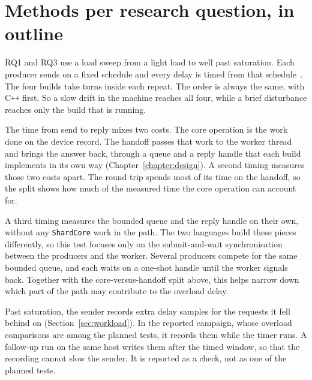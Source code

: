 \documentclass[english,oneside,a4paper,censored,csm,software-track-2020]{HYthesisML}
\begin{document}
\section[Methods per research question]{Methods per research question, in outline}\label{sec:methodbrief}
RQ1 and RQ3 use a load sweep from a light load to well past saturation. Each
producer sends on a fixed schedule and every delay is timed from that
schedule~\cite{schroeder2006openclosed}. The four builds take turns inside each
repeat. The order is always the same, with C\texttt{++} first. So a slow drift in
the machine reaches all four, while a brief disturbance reaches only the build
that is running.

The time from send to reply mixes two costs. The core operation is the work
done on the device record. The handoff passes that work to the worker thread
and brings the answer back, through a queue and a reply handle that each build
implements in its own way (Chapter~\ref{chapter:design}). A second timing
measures those two costs apart. The round trip spends most of its time on the
handoff, so the split shows how much of the measured time the core operation
can account for. 

A third timing measures the bounded queue and the reply handle on their own, 
without any \texttt{ShardCore} work in the path. 
The two languages build these pieces differently, so this test focuses only on 
the submit-and-wait synchronisation between the producers and the worker. 
Several producers compete for the same bounded queue, and each waits on a
one-shot handle until the worker signals back. Together with the core-versus-handoff
split above, this helps narrow down which part of the path may contribute to the 
overload delay.

Past saturation, the sender records extra delay samples for the requests it
fell behind on (Section~\ref{sec:workload}). In the reported campaign, whose
overload comparisons are among the planned tests, it records them while the
timer runs. A follow-up run on the same host writes them after the timed
window, so that the recording cannot slow the sender. It is reported as a
check, not as one of the planned tests.
\end{document}
